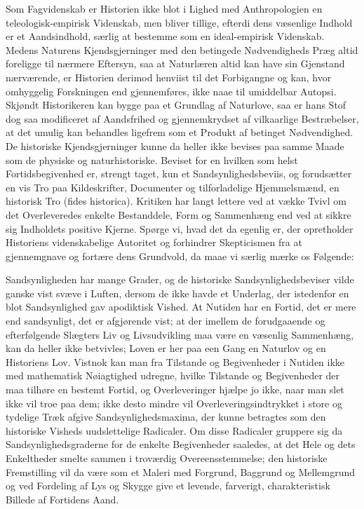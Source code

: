\documentclass[12pt]{book}
\newcommand{\apage}[1]{\marginnote{\footnotesize\textit{[#1]}}}
\begin{document}
\noindent Som Fagvidenskab er Historien ikke blot i Lighed med
Anthropologien en teleologisk-empirisk Videnskab, men bliver tillige,
efterdi dens væsenlige Indhold er et Aandsindhold, særlig at bestemme som
en ideal-empirisk Videnskab. Medens Naturens Kjendsgjerninger med den
betingede Nødvendigheds Præg altid foreligge til nærmere Eftersyn, saa at
Naturlæren altid kan have sin Gjenstand nærværende, er Historien derimod
henviist til det Forbigangne og kan, hvor omhyggelig Forskningen end
gjennemføres, ikke naae til umiddelbar Autopsi. Skjøndt Historikeren kan
bygge paa et Grundlag af Naturlove, saa er hans Stof dog saa modificeret af
Aandsfrihed og gjennemkrydset af vilkaarlige Bestræbelser, at det umulig kan
behandles ligefrem som et Produkt af betinget Nødvendighed. De historiske
Kjendsgjerninger kunne da heller ikke bevises paa samme Maade som de
physiske og naturhistoriske. Beviset for en hvilken som helst
Fortidsbegivenhed er, strengt taget, kun et Sandsynlighedsbeviis, og
forudsætter en vis Tro paa Kildeskrifter, Documenter og tilforladelige
Hjemmelsmænd, en historisk Tro (fides historica). Kritiken har
langt lettere ved at vække Tvivl om det Overleveredes enkelte Bestanddele,
Form og Sammenhæng end ved at sikkre sig Indholdets positive Kjerne. Spørge
vi, hvad det da egenlig er, der opretholder Historiens videnskabelige
Autoritet og forhindrer Skepticismen fra at gjennemgnave og fortære dens
Grundvold, da maae vi særlig mærke os Følgende:

\apage{231} Sandsynligheden har mange Grader, og de historiske Sandsynlighedsbeviser
vilde ganske vist svæve i Luften, dersom de ikke havde et Underlag, der
istedenfor en blot Sandsynlighed gav apodiktisk Vished. At Nutiden har en
Fortid, det er mere end sandsynligt, det er afgjørende vist; at der imellem
de forudgaaende og efterfølgende Slægters Liv og Livsudvikling maa være en
væsenlig Sammenhæng, kan da heller ikke betvivles; Loven er her paa een Gang
en Naturlov og en Historiens Lov. Vistnok kan man fra Tilstande og
Begivenheder i Nutiden ikke med mathematisk Nøiagtighed udregne, hvilke
Tilstande og Begivenheder der maa tilhøre en bestemt Fortid, og
Overleveringer hjælpe jo ikke, naar man slet ikke vil troe paa dem; ikke
desto mindre vil Overleveringsindtrykket i store og tydelige Træk afgive
Sandsynlighedsmaxima, der kunne betragtes som den historiske Visheds
uudslettelige Radicaler. Om disse Radicaler gruppere sig da
Sandsynlighedsgraderne for de enkelte Begivenheder saaledes, at det Hele og
dets Enkeltheder smelte sammen i troværdig Overeensstemmelse; den historiske
Fremstilling vil da være som et Maleri med Forgrund, Baggrund og Mellemgrund
og ved Fordeling af Lys og Skygge give et levende, farverigt,
charakteristisk Billede af Fortidens Aand.
\end{document}
